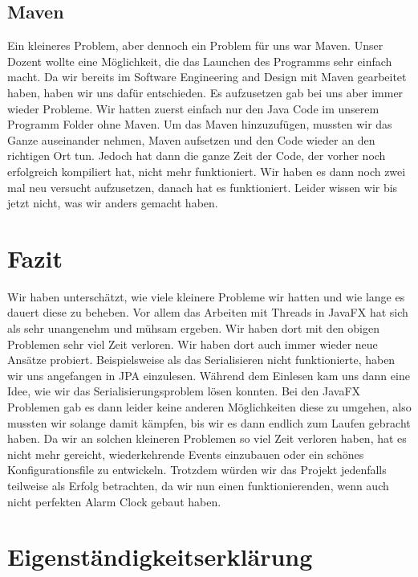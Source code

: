 \documentclass[11pt,titelpage]{scrartcl}
\begin{document}
\subsection{Maven}
Ein kleineres Problem, aber dennoch ein Problem für uns war Maven. Unser Dozent wollte eine Möglichkeit, die das Launchen des Programms sehr einfach macht. Da wir bereits im Software Engineering and Design mit Maven gearbeitet
haben, haben wir uns dafür entschieden. Es aufzusetzen gab bei uns aber immer wieder Probleme. Wir hatten zuerst einfach nur den Java Code im unserem Programm Folder ohne Maven. Um das Maven hinzuzufügen, mussten wir das Ganze
auseinander nehmen, Maven aufsetzen und den Code wieder an den richtigen Ort tun. Jedoch hat dann die ganze Zeit der Code, der vorher noch erfolgreich kompiliert hat, nicht mehr funktioniert. Wir haben es dann noch zwei mal neu
versucht aufzusetzen, danach hat es funktioniert. Leider wissen wir bis jetzt nicht, was wir anders gemacht haben.

\section{Fazit}
Wir haben unterschätzt, wie viele kleinere Probleme wir hatten und wie lange es dauert diese zu beheben. Vor allem das Arbeiten mit Threads in JavaFX hat sich als sehr
unangenehm und mühsam ergeben. Wir haben dort mit den obigen Problemen sehr viel Zeit verloren. Wir haben dort auch immer wieder neue Ansätze probiert. Beispielsweise als das
Serialisieren nicht funktionierte, haben wir uns angefangen in JPA einzulesen. Während dem Einlesen kam uns dann eine Idee, wie wir das Serialisierungsproblem lösen konnten.
Bei den JavaFX Problemen gab es dann leider keine anderen Möglichkeiten diese zu umgehen, also mussten wir solange damit kämpfen, bis wir es dann endlich zum Laufen
gebracht haben.
Da wir an solchen kleineren Problemen so viel Zeit verloren haben, hat es nicht mehr gereicht, wiederkehrende Events einzubauen oder ein schönes Konfigurationsfile
zu entwickeln.
Trotzdem würden wir das Projekt jedenfalls teilweise als Erfolg betrachten, da wir nun einen funktionierenden, wenn auch nicht perfekten Alarm Clock gebaut haben.

\section{Eigenständigkeitserklärung}


\end{document}
